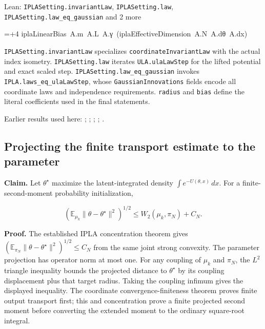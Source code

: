 \documentclass[11pt,a4paper]{report}
\newlength{\leancharwidth}
\newenvironment{leancode}{\par\smallskip\begingroup\ttfamily\footnotesize\raggedright
  \settowidth{\leancharwidth}{M}\setlength{\parskip}{0pt}\setlength{\parindent}{0pt}
  \frenchspacing}{\par\endgroup\smallskip}
\newcommand{\leanline}[2]{\hangindent=\dimexpr#1\leancharwidth+4\leancharwidth\relax
  \hangafter=1\noindent\hspace*{#1\leancharwidth}#2\par}
\newcommand{\leanlabel}[1]{\par\smallskip\noindent{\small\bfseries #1}\par}
\begin{document}
\begin{leanbox}{Lean: \texttt{IPLASetting.\allowbreak{}invariantLaw}, \texttt{IPLASetting.\allowbreak{}law}, \texttt{IPLASetting.\allowbreak{}law\_\allowbreak{}eq\_\allowbreak{}gaussian} and 2 more}
\begin{leancode}
\leanline{2}{iplaLinearBias\ A.m\ A.L\ A.γ\ (iplaEffectiveDimension\ A.N\ A.dθ\ A.dx)}
\end{leancode}
\leanlabel{How the Lean proof follows the argument}
\texttt{IPLASetting.\allowbreak{}invariant\allowbreak{}Law} specializes \texttt{coordinate\allowbreak{}Invariant\allowbreak{}Law} with the actual index isometry. \texttt{IPLASetting.\allowbreak{}law} iterates \texttt{ULA.\allowbreak{}ula\allowbreak{}Law\allowbreak{}Step} for the lifted potential and exact scaled step. \texttt{IPLASetting.\allowbreak{}law\_\allowbreak{}eq\_\allowbreak{}gaussian} invokes \texttt{IPLA.\allowbreak{}laws\_\allowbreak{}eq\_\allowbreak{}ula\allowbreak{}Law\allowbreak{}Step}, whose \texttt{Gaussian\allowbreak{}Innovations} fields encode all coordinate laws and independence requirements. \texttt{radius} and \texttt{bias} define the literal coefficients used in the final statements.
\end{leanbox}


Earlier results used here: \cite[Section~3.36.7]{LangevinLean2026ULASC}; \cite[Section~3.1.1]{LangevinLean2026IPLA}; \cite[Section~3.16.3]{LangevinLean2026IPLA}; \cite[Section~3.3.2]{LangevinLean2026IPLA}; \cite[Section~3.3.3]{LangevinLean2026IPLA}.
\subsection{\texorpdfstring{Projecting the finite transport estimate to the parameter}{Projecting the finite transport estimate to the parameter}}
\label{report-step-WassersteinMixing-IPLA-lean-3}


\textbf{Claim.} Let \(\theta^\star\) maximize the latent-integrated density \(\int e^{-U(\theta,x)}\,dx\). For a finite-second-moment probability initialization,

\[\left(\mathbb E_{\mu_k}\|\theta-\theta^\star\|^2\right)^{1/2}\le W_2(\mu_k,\pi_N)+C_N.\]


\textbf{Proof.} The established IPLA concentration theorem gives \((\mathbb E_{\pi_N}\|\theta-\theta^\star\|^2)^{1/2}\le C_N\) from the same joint strong convexity. The parameter projection has operator norm at most one. For any coupling of \(\mu_k\) and \(\pi_N\), the \(L^2\) triangle inequality bounds the projected distance to \(\theta^\star\) by its coupling displacement plus that target radius. Taking the coupling infimum gives the displayed inequality. The coordinate convergence-finiteness theorem proves finite output transport first; this and concentration prove a finite projected second moment before converting the extended moment to the ordinary square-root integral.
\end{document}
